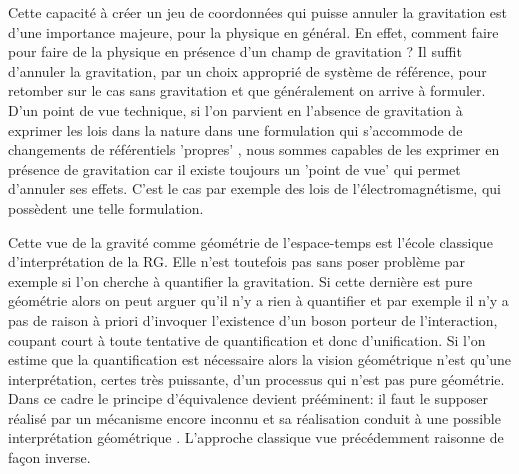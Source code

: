 Cette capacité à créer un jeu de coordonnées qui puisse annuler la gravitation est d'une importance majeure, pour la physique en général. En effet, comment faire pour faire de la physique en présence d'un champ de gravitation ? Il suffit d'annuler la gravitation, par un choix approprié de système de référence, pour retomber sur le cas sans gravitation et que généralement on arrive à formuler. D'un point de vue technique, si l'on parvient en l'absence de gravitation à exprimer les lois dans la nature dans une formulation qui s'accommode de changements de référentiels 'propres' , nous sommes capables de les exprimer en présence de gravitation car il existe toujours un 'point de vue' qui permet d'annuler ses effets. C'est le cas par exemple des lois de l'électromagnétisme, qui possèdent une telle formulation.

Cette vue de la gravité comme géométrie de l'espace-temps est l'école classique d'interprétation de la RG. Elle n'est toutefois pas sans poser problème par exemple si l'on cherche à quantifier la gravitation. Si cette dernière est pure géométrie alors on peut arguer qu'il n'y a rien à quantifier et par exemple il n'y a pas de raison à priori d'invoquer l'existence d'un boson porteur de l'interaction, coupant court à toute tentative de quantification et donc d'unification. Si l'on estime que la quantification est nécessaire alors la vision géométrique n'est qu'une interprétation, certes très puissante, d'un processus qui n'est pas pure géométrie. Dans ce cadre le principe d'équivalence devient prééminent: il faut le supposer réalisé par un mécanisme encore inconnu et sa réalisation conduit à une possible interprétation géométrique . L'approche classique vue précédemment raisonne de façon inverse.

